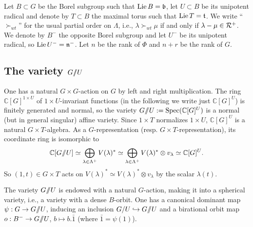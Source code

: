\documentclass{emsprocart}
\theoremstyle{definition}
\begin{document}
Let $B\subset G$  be the Borel subgroup such that $\hbox{Lie\,}B=\mathfrak b$, let $U\subset B$ be its unipotent radical
and denote by $T\subset B$ the maximal torus such that $\hbox{Lie\,}T=\mathfrak t$.
We write ``$\succ_{wt}$'' for the usual partial order on $\Lambda$, i.e., $\lambda\succ_{wt}\mu$ if and only if $\lambda-\mu\in{\cal R}^+$.
We denote by $B^-$ the opposite Borel subgroup and let $U^-$  be its unipotent radical, so $\hbox{Lie\,}U^-=\mathfrak n^-$.
Let $n$ be the rank of $\Phi$ and $n+r$ be the rank of $G$.

\subsection{The \texorpdfstring{variety ${G/\hskip -4pt/U}$}{flag variety}}\label{flagvariety}
 One has a natural $G\times G$-action on $G$ by left and right multiplication.
The ring $\mathbb C[G]^{1\times U}$ of $1\times U$-invariant functions (in the following we write just $\mathbb C[G]^{U}$) is
finitely generated and normal, so the variety $G/\hskip -3.5pt/U:=\hbox{\textrm{Spec}}(\mathbb C[G]^U)$  is a normal
(but in general singular) affine variety.
Since $1\times T$ normalizes $1\times U$, $\mathbb C[G]^U$ is a natural $G\times T$-algebra.
As a $G$-representation (resp. $G\times T$-representation), its coordinate ring is isomorphic to
\begin{equation}\label{coordinateGnachU}
\mathbb C[G/\hskip -3.5pt/U]\simeq \bigoplus_{\lambda\in\Lambda^+} V(\lambda)^*\simeq \bigoplus_{\lambda\in\Lambda^+} V(\lambda)^*\otimes v_\lambda\simeq \mathbb C[G]^U.
\end{equation}
So  $(1,t)\in G\times T$ acts on $V(\lambda)^*\simeq V(\lambda)^*\otimes v_\lambda$ by the scalar $\lambda(t)$.

The variety $G/\hskip -3.5pt/U$ is endowed with a natural $G$-action, making it into a spherical variety, i.e., a variety with a dense $B$-orbit.
One has a canonical dominant map $\psi:G\rightarrow G/\hskip -3.5pt/U$, inducing an inclusion $G/U\hookrightarrow G/\hskip -3.5pt/U$
and a birational orbit map  $o:B^-\rightarrow G/\hskip -3.5pt/U$, $b\mapsto b.\bar{1}$ (where $\bar{1}=\psi(1)$).
\end{document}
